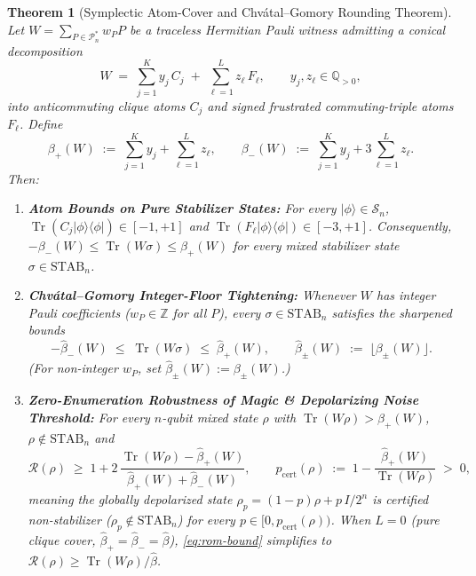 \documentclass[11pt,a4paper]{article}
\newtheorem{theorem}{Theorem}[section]
\theoremstyle{definition}
\theoremstyle{remark}
\newcommand{\Z}{\mathbb{Z}}
\newcommand{\Q}{\mathbb{Q}}
\newcommand{\STAB}{\mathrm{STAB}}
\newcommand{\RoM}{\mathcal{R}}
\newcommand{\Pauli}{\mathcal{P}}
\newcommand{\Tr}{\operatorname{Tr}}
\begin{document}
\begin{theorem}[Symplectic Atom-Cover and Chv\'atal--Gomory Rounding Theorem]
\label{thm:atom-cover}
Let $W = \sum_{P \in \Pauli_n^*} w_P P$ be a traceless Hermitian Pauli witness admitting a conical decomposition
\begin{equation}
  W \;=\; \sum_{j=1}^{K} y_j\, C_j \;+\; \sum_{\ell=1}^{L} z_\ell\, F_\ell, \qquad y_j, z_\ell \in \Q_{> 0},
  \label{eq:atom-decomp}
\end{equation}
into anticommuting clique atoms $C_j$ and signed frustrated commuting-triple atoms $F_\ell$. Define
\begin{equation}
  \beta_+(W) \;:=\; \sum_{j=1}^K y_j + \sum_{\ell=1}^L z_\ell, \qquad
  \beta_-(W) \;:=\; \sum_{j=1}^K y_j + 3\sum_{\ell=1}^L z_\ell.
  \label{eq:beta-bounds}
\end{equation}
Then:
\begin{enumerate}[label=(\alph*),leftmargin=1.8em,itemsep=2pt]
  \item \textbf{Atom Bounds on Pure Stabilizer States:} For every $|\phi\rangle \in \mathcal{S}_n$, $\Tr(C_j |\phi\rangle\langle\phi|) \in [-1, +1]$ and $\Tr(F_\ell |\phi\rangle\langle\phi|) \in [-3, +1]$. Consequently, $-\beta_-(W) \le \Tr(W \sigma) \le \beta_+(W)$ for every mixed stabilizer state $\sigma \in \STAB_n$.
  \item \textbf{Chv\'atal--Gomory Integer-Floor Tightening:} Whenever $W$ has integer Pauli coefficients ($w_P \in \Z$ for all $P$), every $\sigma \in \STAB_n$ satisfies the sharpened bounds
  \begin{equation}
    -\hat{\beta}_-(W) \;\le\; \Tr(W \sigma) \;\le\; \hat{\beta}_+(W), \qquad
    \hat{\beta}_\pm(W) \;:=\; \lfloor \beta_\pm(W) \rfloor.
    \label{eq:cg-floor}
  \end{equation}
  (For non-integer $w_P$, set $\hat{\beta}_\pm(W) := \beta_\pm(W)$.)
  \item \textbf{Zero-Enumeration Robustness of Magic \& Depolarizing Noise Threshold:} For every $n$-qubit mixed state $\rho$ with $\Tr(W \rho) > \hat{\beta}_+(W)$, $\rho \notin \STAB_n$ and
  \begin{equation}
    \RoM(\rho) \;\ge\; 1 + 2\,\frac{\Tr(W\rho) - \hat{\beta}_+(W)}{\hat{\beta}_+(W) + \hat{\beta}_-(W)},
    \qquad
    p_{\mathrm{cert}}(\rho) \;:=\; 1 - \frac{\hat{\beta}_+(W)}{\Tr(W\rho)} \;>\; 0,
    \label{eq:rom-bound}
  \end{equation}
  meaning the globally depolarized state $\rho_p = (1 - p)\rho + p\,I/2^n$ is certified non-stabilizer ($\rho_p \notin \STAB_n$) for every $p \in [0, p_{\mathrm{cert}}(\rho))$. When $L = 0$ (pure clique cover, $\hat{\beta}_+ = \hat{\beta}_- = \hat{\beta}$), \eqref{eq:rom-bound} simplifies to $\RoM(\rho) \ge \Tr(W\rho)/\hat{\beta}$.
\end{enumerate}
\end{theorem}
\end{document}
